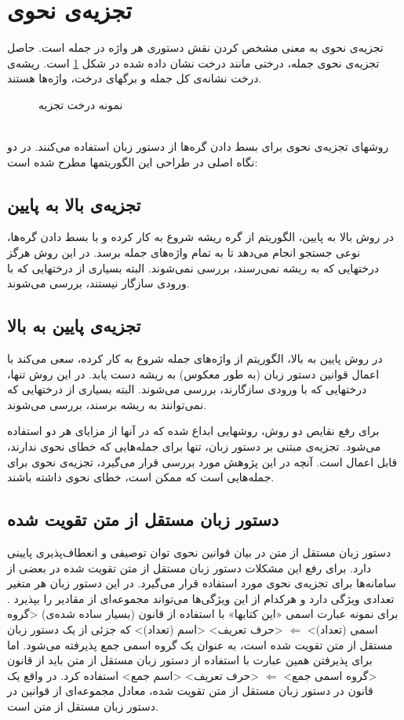 \documentclass{report}
\begin{document}
\section{تجزیه‌ی نحوی}
تجزیه‌ی نحوی به معنی مشخص کردن نقش دستوری هر واژه در جمله است. حاصل تجزیه‌ی نحوی جمله، درختی مانند درخت نشان داده شده در شکل \ref{parsing} است. ریشه‌ی درخت نشانه‌ی کل جمله و برگهای درخت، واژه‌ها هستند.
\begin{figure}[h]
\caption{\label{parsing} نمونه درخت تجزیه}
\end{figure}
\\
روشهای تجزیه‌ی نحوی برای بسط دادن گره‌ها از دستور زبان استفاده می‌کنند. در \cite{ct2} دو نگاه اصلی در طراحی این الگوریتمها مطرح شده است:

\subsection{تجزیه‌ی بالا به پایین}
در روش بالا به پایین، الگوریتم از گره ریشه شروع به کار کرده و با بسط دادن گره‌ها، نوعی جستجو انجام می‌دهد تا به تمام واژه‌های جمله برسد. در این روش هرگز درختهایی که به ریشه نمی‌رسند، بررسی نمی‌شوند. البته بسیاری از درختهایی که با ورودی سازگار نیستند، بررسی می‌شوند.
\subsection{تجزیه‌ی پایین به بالا}
در روش پایین به بالا، الگوریتم از واژه‌های جمله شروع به کار کرده، سعی می‌کند با اعمال قوانین دستور زبان (‌به طور معکوس‌) به ریشه دست‌ یابد. در این روش تنها، درختهایی که با ورودی سازگارند، بررسی می‌شوند. البته بسیاری از درختهایی که نمی‌توانند به ریشه برسند، بررسی می‌شوند.

برای رفع نقایص دو روش، روشهایی ابداع شده که در آنها از مزایای هر دو استفاده می‌شود. تجزیه‌ی مبتنی بر دستور زبان، تنها برای جمله‌هایی که خطای نحوی ندارند، قابل اعمال است. آنچه در این پژوهش مورد بررسی قرار می‌گیرد، تجزیه‌ی نحوی برای جمله‌هایی است که ممکن است، خطای نحوی داشته باشند.

\subsection{دستور زبان مستقل از متن تقویت شده}
دستور زبان مستقل از متن در بیان قوانین نحوی توان توصیفی و انعطاف‌پذیری پایینی دارد. برای رفع این مشکلات دستور زبان مستقل از متن تقویت شده‌ در بعضی از سامانه‌ها برای تجزیه‌ی نحوی مورد استفاده قرار می‌گیرد. در این دستور زبان هر متغیر تعدادی ویژگی دارد و هرکدام از این ویژگی‌ها می‌تواند مجموعه‌ای از مقادیر را بپذیرد \cite{ct4}. 
برای نمونه عبارت اسمی «این کتابها» با استفاده از قانون (بسیار ساده شده‌ی)
<گروه اسمی (تعداد)> $\Longleftarrow$ <حرف تعریف> <اسم (تعداد)>
که جزئی از یک دستور زبان مستقل از متن تقویت شده است، به عنوان یک گروه اسمی جمع پذیرفته می‌شود. اما برای پذیرفتن همین عبارت با استفاده از دستور زبان مستقل از متن باید از قانون 
<گروه اسمی جمع> $\Longleftarrow$ <حرف تعریف> <اسم جمع>
استفاده کرد. در واقع یک قانون در دستور زبان مستقل از متن تقویت شده، معادل مجموعه‌ای از قوانین در دستور زبان مستقل از متن است. 
\end{document}
